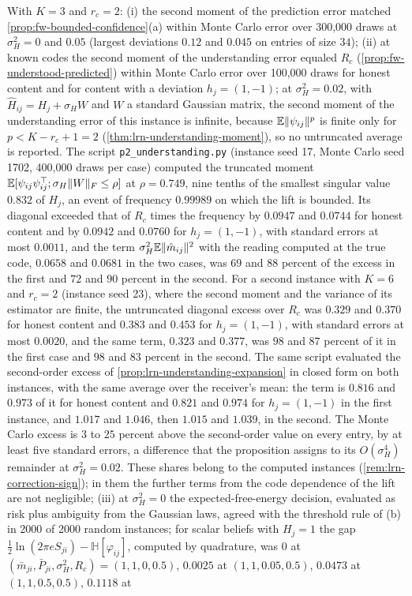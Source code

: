 \begin{numcheck}\label{chk:fw-efe}
With $K=3$ and $r_c=2$: (i) the second moment of the prediction error matched \cref{prop:fw-bounded-confidence}(a) within Monte Carlo error over 300{,}000 draws at $\sigma_H^2=0$ and $0.05$ (largest deviations $0.12$ and $0.045$ on entries of size $34$); (ii) at known codes the second moment of the understanding error equaled $R_c$ (\cref{prop:fw-understood-predicted}) within Monte Carlo error over 100{,}000 draws for honest content and for content with a deviation $h_j=(1,-1)$; at $\sigma_H^2=0.02$, with $\hat H_{ij}=H_j+\sigma_HW$ and $W$ a standard Gaussian matrix, the second moment of the understanding error of this instance is infinite, because $\mathbb{E}\Vert\psi_{ij}\Vert^p$ is finite only for $p<K-r_c+1=2$ (\cref{thm:lrn-understanding-moment}), so no untruncated average is reported. The script \texttt{p2\_understanding.py} (instance seed 17, Monte Carlo seed 1702, 400{,}000 draws per case) computed the truncated moment $\mathbb{E}[\psi_{ij}\psi_{ij}^\top;\sigma_H\Vert W\Vert_F\le\rho]$ at $\rho=0.749$, nine tenths of the smallest singular value $0.832$ of $H_j$, an event of frequency $0.99989$ on which the lift is bounded. Its diagonal exceeded that of $R_c$ times the frequency by $0.0947$ and $0.0744$ for honest content and by $0.0942$ and $0.0760$ for $h_j=(1,-1)$, with standard errors at most $0.0011$, and the term $\sigma_H^2\mathbb{E}\Vert\hat m_{ij}\Vert^2$ with the reading computed at the true code, $0.0658$ and $0.0681$ in the two cases, was $69$ and $88$ percent of the excess in the first and $72$ and $90$ percent in the second. For a second instance with $K=6$ and $r_c=2$ (instance seed 23), where the second moment and the variance of its estimator are finite, the untruncated diagonal excess over $R_c$ was $0.329$ and $0.370$ for honest content and $0.383$ and $0.453$ for $h_j=(1,-1)$, with standard errors at most $0.0020$, and the same term, $0.323$ and $0.377$, was $98$ and $87$ percent of it in the first case and $98$ and $83$ percent in the second. The same script evaluated the second-order excess of \cref{prop:lrn-understanding-expansion} in closed form on both instances, with the same average over the receiver's mean: the term is $0.816$ and $0.973$ of it for honest content and $0.821$ and $0.974$ for $h_j=(1,-1)$ in the first instance, and $1.017$ and $1.046$, then $1.015$ and $1.039$, in the second. The Monte Carlo excess is $3$ to $25$ percent above the second-order value on every entry, by at least five standard errors, a difference that the proposition assigns to its $O(\sigma_H^4)$ remainder at $\sigma_H^2=0.02$. These shares belong to the computed instances (\cref{rem:lrn-correction-sign}); in them the further terms from the code dependence of the lift are not negligible; (iii) at $\sigma_H^2=0$ the expected-free-energy decision, evaluated as risk plus ambiguity from the Gaussian laws, agreed with the threshold rule of (b) in 2000 of 2000 random instances; for scalar beliefs with $H_j=1$ the gap $\tfrac12\ln(2\pi eS_{ji})-\mathbb H[\varphi_{ij}]$, computed by quadrature, was $0$ at $(\bar m_{ji},\bar P_{ji},\sigma_H^2,R_c)=(1,1,0,0.5)$, $0.0025$ at $(1,1,0.05,0.5)$, $0.0473$ at $(1,1,0.5,0.5)$, $0.1118$ at 
\end{numcheck}
